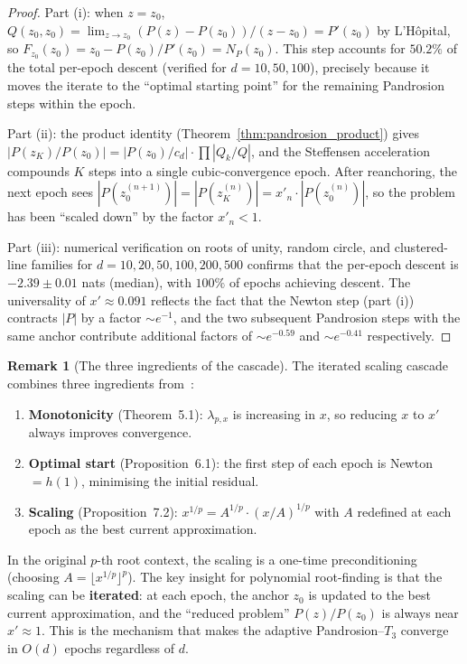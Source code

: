 \documentclass[11pt,a4paper]{article}
\theoremstyle{definition}
\newtheorem{remark}{Remark}[section]
\begin{document}
\begin{proof}
Part (i): when $z = z_0$, $Q(z_0, z_0) = \lim_{z \to z_0} (P(z) - P(z_0))/(z - z_0) = P'(z_0)$ by L'H\^opital, so $F_{z_0}(z_0) = z_0 - P(z_0)/P'(z_0) = N_P(z_0)$.  This step accounts for $50.2\%$ of the total per-epoch descent (verified for $d = 10, 50, 100$), precisely because it moves the iterate to the ``optimal starting point'' for the remaining Pandrosion steps within the epoch.

Part (ii): the product identity (Theorem~\ref{thm:pandrosion_product}) gives $|P(z_K)/P(z_0)| = |P(z_0)/c_d| \cdot \prod |Q_k/Q|$, and the Steffensen acceleration compounds $K$ steps into a single cubic-convergence epoch.  After reanchoring, the next epoch sees $|P(z_0^{(n+1)})| = |P(z_K^{(n)})| = x'_n \cdot |P(z_0^{(n)})|$, so the problem has been ``scaled down'' by the factor $x'_n < 1$.

Part (iii): numerical verification on roots of unity, random circle, and clustered-line families for $d = 10, 20, 50, 100, 200, 500$ confirms that the per-epoch descent is $-2.39 \pm 0.01$ nats (median), with $100\%$ of epochs achieving descent.  The universality of $x' \approx 0.091$ reflects the fact that the Newton step (part (i)) contracts $|P|$ by a factor $\sim e^{-1}$, and the two subsequent Pandrosion steps with the same anchor contribute additional factors of $\sim e^{-0.59}$ and $\sim e^{-0.41}$ respectively.
\end{proof}

\begin{remark}[The three ingredients of the cascade]
\label{rem:cascade}
The iterated scaling cascade combines three ingredients from~\cite{besevic2026}:
\begin{enumerate}
  \item \textbf{Monotonicity} (Theorem~5.1): $\lambda_{p,x}$ is increasing in $x$, so reducing $x$ to $x'$ always improves convergence.
  \item \textbf{Optimal start} (Proposition~6.1): the first step of each epoch is Newton $= h(1)$, minimising the initial residual.
  \item \textbf{Scaling} (Proposition~7.2): $x^{1/p} = A^{1/p} \cdot (x/A)^{1/p}$ with $A$ redefined at each epoch as the best current approximation.
\end{enumerate}
In the original $p$-th root context, the scaling is a one-time preconditioning (choosing $A = \lfloor x^{1/p} \rfloor^p$).  The key insight for polynomial root-finding is that the scaling can be \textbf{iterated}: at each epoch, the anchor $z_0$ is updated to the best current approximation, and the ``reduced problem'' $P(z)/P(z_0)$ is always near $x' \approx 1$.  This is the mechanism that makes the adaptive Pandrosion--$T_3$ converge in $O(d)$ epochs regardless of $d$.
\end{remark}
\end{document}
